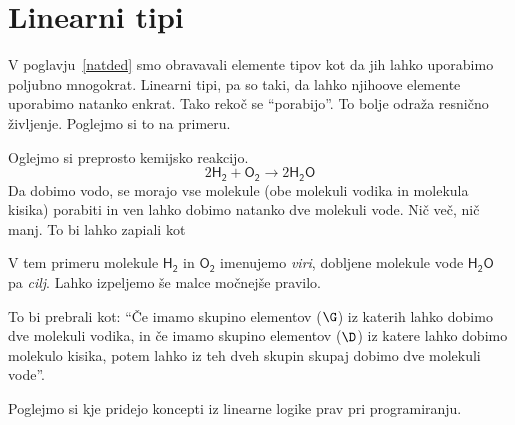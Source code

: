 \section{Linearni tipi}

V poglavju~\ref{natded} smo obravavali elemente tipov kot da jih lahko uporabimo poljubno mnogokrat. Linearni tipi, pa so taki, da lahko njihoove elemente uporabimo natanko enkrat. Tako rekoč se ``porabijo''. To bolje odraža resnično življenje. Poglejmo si to na primeru.

\begin{primer}
    Oglejmo si preprosto kemijsko reakcijo.
    \begin{equation*}
        2 \mathsf{H_2} + \mathsf{O_2} \rightarrow 2 \mathsf{H_2 O}
    \end{equation*}
    Da dobimo vodo, se morajo vse molekule (obe molekuli vodika in molekula kisika) porabiti in ven lahko dobimo natanko dve molekuli vode. Nič več, nič manj.
    To bi lahko zapiali kot
    \begin{prooftree}
    \end{prooftree}
    V tem primeru molekule \(\mathsf{H_2}\) in \(\mathsf{O_2}\) imenujemo \emph{viri}, dobljene molekule vode \(\mathsf{H_2 O}\) pa \emph{cilj}. Lahko izpeljemo še malce močnejše pravilo.
    \begin{prooftree}
    \end{prooftree}
    To bi prebrali kot: ``Če imamo skupino elementov (\(\G\)) iz katerih lahko dobimo dve molekuli vodika, in če imamo skupino elementov (\(\D\)) iz katere lahko dobimo molekulo kisika, potem lahko iz teh dveh skupin skupaj dobimo dve molekuli vode''.
\end{primer}


Poglejmo si kje pridejo koncepti iz linearne logike prav pri programiranju.



